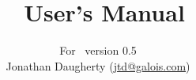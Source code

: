 \title{\vtyui\ User's Manual}
\author{
  For \vtyui\ version 0.5\\
  Jonathan Daugherty (\href{mailto:jtd@galois.com}{jtd@galois.com})
}
\maketitle
